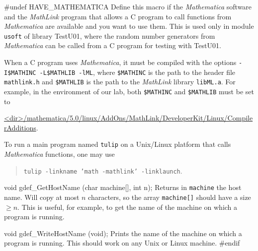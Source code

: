 #undef HAVE_MATHEMATICA
\endcode
  \tab  Define this macro if the {\em Mathematica\/}
    software \cite{mWOL96a}
   and the {\em MathLink} program that allows a C program to call
   functions from {\em Mathematica} are available and you want to use them.
   This is used only in module \texttt{usoft} 
   of library TestU01, where the random number generators from 
   {\em Mathematica} can be called from a C program for testing with TestU01.

   When a C program uses {\em Mathematica}, it must be compiled with the
    options
   \texttt{-I\$MATHINC -L\$MATHLIB -lML}, where 
   \texttt{\$MATHINC} is the path to the header file \texttt{mathlink.h} and 
   \texttt{\$MATHLIB} is the path to the {\em MathLink\/} library \texttt{libML.a}.
   For example, in the environment of our lab, both 
   \texttt{\$MATHINC} and \texttt{\$MATHLIB} must be set to

   \url{<dir>/mathematica/5.0/linux/AddOns/MathLink/DeveloperKit/Linux/CompilerAdditions}.

  To run a main program named \texttt{tulip} on a Unix/Linux platform
  that calls {\em  Mathematica} functions, one may use
 \begin{verse} 
  \texttt{tulip -linkname 'math -mathlink' -linklaunch}.
 \end{verse}
  \endtab
\fi  %


\code

void gdef_GetHostName (char machine[], int n);
\endcode
  \tab Returns in \texttt{machine} the host name. 
  Will copy at most $n$ characters, so the array \texttt{machine[]}
  should have a size $\ge n$. This is useful, for example,
  to get the name of the machine on which a program is running.
  \endtab
\code

void gdef_WriteHostName (void);
\endcode
  \tab Prints the name of the machine on which a program is running.
   This should work on any Unix or Linux machine.
  \endtab
\hide
\code
#endif
\endcode
\endhide

